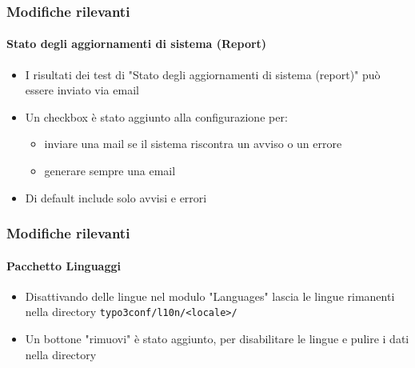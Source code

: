 \begin{frame}[fragile]
	\frametitle{Modifiche rilevanti}
	\framesubtitle{Stato degli aggiornamenti di sistema (Report)}

	\begin{itemize}
		\item I risultati dei test di "Stato degli aggiornamenti di sistema (report)" può essere inviato via email
		\item Un checkbox è stato aggiunto alla configurazione per:

			\begin{itemize}
				\item inviare una mail se il sistema riscontra un avviso o un errore
				\item generare sempre una email
			\end{itemize}

		\item Di default include solo avvisi e errori

	\end{itemize}

\end{frame}







\begin{frame}[fragile]
	\frametitle{Modifiche rilevanti}
	\framesubtitle{Pacchetto Linguaggi}

	\begin{itemize}
		\item Disattivando delle lingue nel modulo "Languages" lascia le lingue rimanenti
			nella directory \texttt{typo3conf/l10n/<locale>/}
		\item Un bottone "rimuovi" è stato aggiunto, per disabilitare le lingue e pulire i
			dati nella directory
	\end{itemize}

\end{frame}








